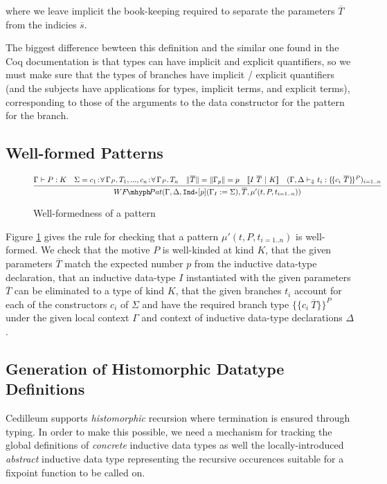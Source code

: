 \documentclass{article}
\newcommand{\ann}[2]{#1\! : \! #2}
\newcommand{\absu}[3]{{#1}\, #2.\, #3}
\newcommand{\indast}[4]{\texttt{Ind}_{\text{#1}} [#2] (#3 := #4)}
\newcommand{\lenc}[1]{\|#1\|}
\newcommand{\vars}[1]{{\overline{#1}}}
\newcommand{\decchk}{\vdash_{\Downarrow}}
\newcommand{\wfpat}[4]{WF\!\mhyph\!Pat(#1,#2,#3,#4)}
\newcommand{\llbrace}{\{\!\{}
\newcommand{\rrbrace}{\}\!\}}
\begin{document}
\noindent where we leave implicit the book-keeping required to separate the
parameters $\vars{T}$ from the indicies $\vars{s}$.

The biggest difference bewteen this definition and the similar one found in the
Coq documentation is that types can have implicit and explicit quantifiers, so
we must make sure that the types of branches have implicit / explicit
quantifiers (and the subjects have applications for types, implicit terms, and
explicit terms), corresponding to those of the arguments to the data constructor
for the pattern for the branch.

\subsection{Well-formed Patterns}

\begin{figure}[h]
  \caption{Well-formedness of a pattern}
  \label{fig:wf-pattern}
  \[
    \infer
    { \wfpat{\Gamma,\Delta}{\indast{*}{p}{\Gamma_I}{\Sigma}}{\vars{T}}{\mu'(t,P,t_{i=1..n})}
    }
    { \Gamma \vdash P : K
      \quad \Sigma = \ann{c_1}{\absu{\forall}{\Gamma_P}{T_1}}, ..., \ann{c_n}{\absu{\forall}{\Gamma_P}{T_n}}
      \quad \lenc{\vars{T}} = \lenc{\Gamma_p} = p
      \quad \llbracket I\ \vars{T}\ |\ K \rrbracket
      \quad (\Gamma,\Delta \decchk t_i : \llbrace c_i\ \vars{T} \rrbrace^P)_{i=1..n}
    }
  \]
\end{figure}

Figure \ref{fig:wf-pattern} gives the rule for checking that a pattern
$\mu'(t,P,t_{i=1..n})$ is well-formed. We check that the motive $P$ is
well-kinded at kind $K$, that the given parameters $\vars{T}$ match the expected
number $p$ from the inductive data-type declaration, that an inductive data-type $I$ instantiated with the
given parameters $\vars{T}$ can be eliminated to a type of kind $K$, that the
given branches $t_i$ account for each of the constructors $c_i$ of $\Sigma$ and
have the required branch type $\llbrace c_i\ \vars{T} \rrbrace^P$ under the
given local context $\Gamma$ and context of inductive data-type declarations $\Delta$.

\subsection{Generation of Histomorphic Datatype Definitions}

Cedilleum supports \textit{histomorphic} recursion where termination is ensured
through typing. In order to make this possible, we need a mechanism for tracking
the global definitions of \textit{concrete} inductive data types as well the
locally-introduced \textit{abstract} inductive data type representing the
recursive occurences suitable for a fixpoint function to be called on.
\end{document}
